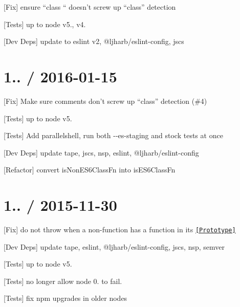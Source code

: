 
\begin{DoxyItemize}
\item \mbox{[}Fix\mbox{]} ensure “class “ doesn’t screw up “class” detection
\item \mbox{[}Tests\mbox{]} up to {\ttfamily node} {\ttfamily v5.}, {\ttfamily v4.}
\item \mbox{[}Dev Deps\mbox{]} update to {\ttfamily eslint} v2, {\ttfamily @ljharb/eslint-\/config}, {\ttfamily jscs}
\end{DoxyItemize}

\section*{1.. / 2016-\/01-\/15 }


\begin{DoxyItemize}
\item \mbox{[}Fix\mbox{]} Make sure comments don’t screw up “class” detection (\#4)
\item \mbox{[}Tests\mbox{]} up to {\ttfamily node} {\ttfamily v5.}
\item \mbox{[}Tests\mbox{]} Add {\ttfamily parallelshell}, run both {\ttfamily -\/-\/es-\/staging} and stock tests at once
\item \mbox{[}Dev Deps\mbox{]} update {\ttfamily tape}, {\ttfamily jscs}, {\ttfamily nsp}, {\ttfamily eslint}, {\ttfamily @ljharb/eslint-\/config}
\item \mbox{[}Refactor\mbox{]} convert {\ttfamily is\+Non\+E\+S6\+Class\+Fn} into {\ttfamily is\+E\+S6\+Class\+Fn}
\end{DoxyItemize}

\section*{1.. / 2015-\/11-\/30 }


\begin{DoxyItemize}
\item \mbox{[}Fix\mbox{]} do not throw when a non-\/function has a function in its \href{#2}{\tt \mbox{[}Prototype\mbox{]}}
\item \mbox{[}Dev Deps\mbox{]} update {\ttfamily tape}, {\ttfamily eslint}, {\ttfamily @ljharb/eslint-\/config}, {\ttfamily jscs}, {\ttfamily nsp}, {\ttfamily semver}
\item \mbox{[}Tests\mbox{]} up to {\ttfamily node} {\ttfamily v5.}
\item \mbox{[}Tests\mbox{]} no longer allow node 0. to fail.
\item \mbox{[}Tests\mbox{]} fix npm upgrades in older nodes
\end{DoxyItemize}

